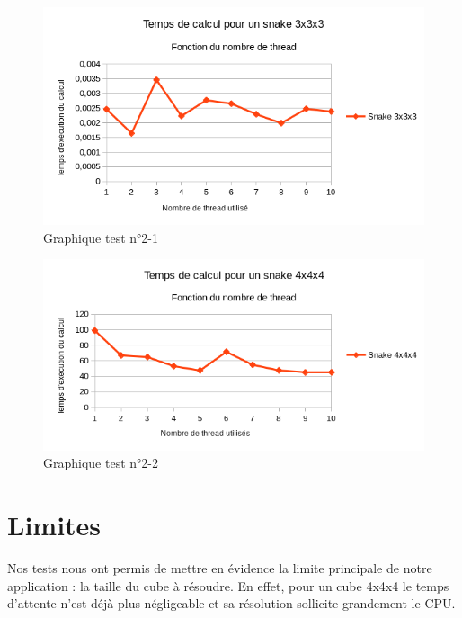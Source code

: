 \begin{figure}[h]
 \centering
 \includegraphics[scale=0.7,keepaspectratio=true]{img/test2-1.png}
 \caption{Graphique test n°2-1}
\end{figure}

\begin{figure}[h]
 \centering
 \includegraphics[scale=0.7,keepaspectratio=true]{img/test2-2.png}
 \caption{Graphique test n°2-2}
\end{figure}

\section{Limites}
Nos tests nous ont permis de mettre en évidence la limite principale de notre application : la taille du cube à résoudre. En effet, pour un cube 4x4x4 le temps d'attente n'est déjà plus négligeable et sa résolution sollicite grandement le CPU. 